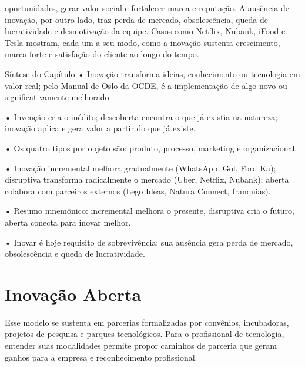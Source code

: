 oportunidades, gerar valor social e fortalecer marca e reputação. A ausência de inovação, por outro lado, traz perda de mercado, obsolescência, queda de lucratividade e desmotivação da equipe. Casos como Netflix, Nubank, iFood e Tesla mostram, cada um a seu modo, como a inovação sustenta crescimento, marca forte e satisfação do cliente ao longo do tempo.

Síntese do Capítulo • Inovação transforma ideias, conhecimento ou tecnologia em valor real; pelo Manual de Oslo da OCDE, é a implementação de algo novo ou significativamente melhorado.

• Invenção cria o inédito; descoberta encontra o que já existia na natureza; inovação aplica e gera valor a partir do que já existe.

• Os quatro tipos por objeto são: produto, processo, marketing e organizacional.

• Inovação incremental melhora gradualmente (WhatsApp, Gol, Ford Ka); disruptiva transforma radicalmente o mercado (Uber, Netflix, Nubank); aberta colabora com parceiros externos (Lego Ideas, Natura Connect, franquias).

• Resumo mnemônico: incremental melhora o presente, disruptiva cria o futuro, aberta conecta para inovar melhor.

• Inovar é hoje requisito de sobrevivência: sua ausência gera perda de mercado, obsolescência e queda de lucratividade.

\chapter{Inovação Aberta}

Esse modelo se sustenta em parcerias formalizadas por convênios, incubadoras, projetos de pesquisa e parques tecnológicos. Para o profissional de tecnologia, entender suas modalidades permite propor caminhos de parceria que geram ganhos para a empresa e reconhecimento profissional.

